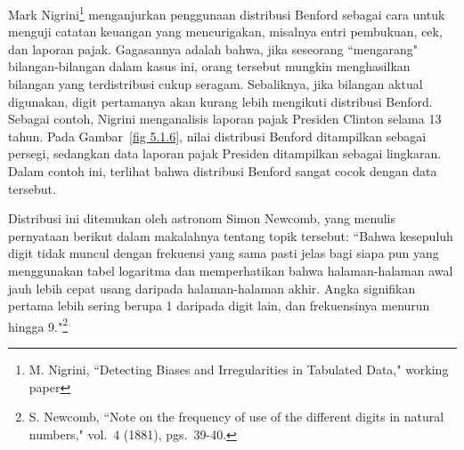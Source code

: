 Mark Nigrini\footnote{M. Nigrini, ``Detecting Biases and Irregularities in
Tabulated Data," working paper} menganjurkan penggunaan distribusi Benford sebagai cara
untuk menguji catatan keuangan yang mencurigakan,
misalnya entri pembukuan, cek, dan laporan pajak. Gagasannya adalah
bahwa, jika seseorang ``mengarang" bilangan-bilangan dalam kasus ini, orang tersebut
mungkin menghasilkan bilangan yang terdistribusi cukup seragam. Sebaliknya, jika bilangan
aktual digunakan, digit pertamanya akan kurang lebih mengikuti distribusi Benford. Sebagai
contoh, Nigrini menganalisis laporan pajak Presiden Clinton selama
13 tahun. Pada Gambar~\ref{fig 5.1.6}, nilai distribusi Benford ditampilkan sebagai
persegi, sedangkan data laporan pajak Presiden ditampilkan sebagai lingkaran. Dalam contoh
ini, terlihat bahwa distribusi Benford sangat cocok dengan data tersebut.
\par
Distribusi ini ditemukan oleh astronom Simon Newcomb, yang menulis
pernyataan berikut dalam makalahnya tentang topik tersebut: ``Bahwa kesepuluh digit tidak
muncul dengan frekuensi yang sama pasti jelas bagi siapa pun yang menggunakan tabel
logaritma dan memperhatikan bahwa halaman-halaman awal jauh lebih cepat usang daripada
halaman-halaman akhir. Angka signifikan pertama lebih sering berupa 1 daripada digit lain,
dan frekuensinya menurun hingga 9."\footnote{S. Newcomb, ``Note on the frequency of use of the different
digits in natural numbers,"  vol.\ 4 (1881), pgs.\ 39-40.}
\exercises
